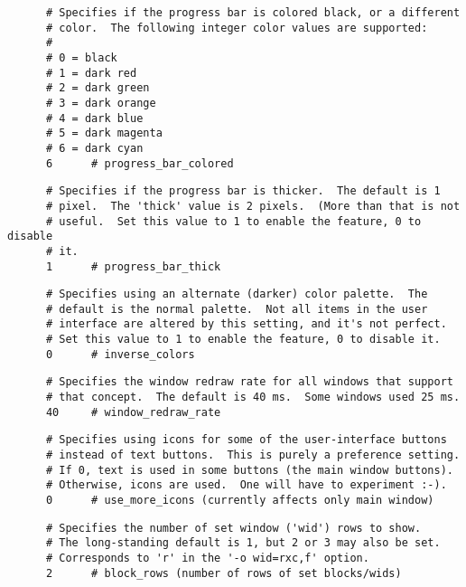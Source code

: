    \begin{verbatim}
      # Specifies if the progress bar is colored black, or a different
      # color.  The following integer color values are supported:
      # 
      # 0 = black
      # 1 = dark red
      # 2 = dark green
      # 3 = dark orange
      # 4 = dark blue
      # 5 = dark magenta
      # 6 = dark cyan
      6      # progress_bar_colored
   \end{verbatim}

   \begin{verbatim}
      # Specifies if the progress bar is thicker.  The default is 1
      # pixel.  The 'thick' value is 2 pixels.  (More than that is not
      # useful.  Set this value to 1 to enable the feature, 0 to disable
      # it.
      1      # progress_bar_thick
   \end{verbatim}

   \begin{verbatim}
      # Specifies using an alternate (darker) color palette.  The
      # default is the normal palette.  Not all items in the user
      # interface are altered by this setting, and it's not perfect.
      # Set this value to 1 to enable the feature, 0 to disable it.
      0      # inverse_colors
   \end{verbatim}

   \begin{verbatim}
      # Specifies the window redraw rate for all windows that support
      # that concept.  The default is 40 ms.  Some windows used 25 ms.
      40     # window_redraw_rate
   \end{verbatim}

   \begin{verbatim}
      # Specifies using icons for some of the user-interface buttons
      # instead of text buttons.  This is purely a preference setting.
      # If 0, text is used in some buttons (the main window buttons).
      # Otherwise, icons are used.  One will have to experiment :-).
      0      # use_more_icons (currently affects only main window)
   \end{verbatim}

   \begin{verbatim}
      # Specifies the number of set window ('wid') rows to show.
      # The long-standing default is 1, but 2 or 3 may also be set.
      # Corresponds to 'r' in the '-o wid=rxc,f' option.
      2      # block_rows (number of rows of set blocks/wids)
   \end{verbatim}

